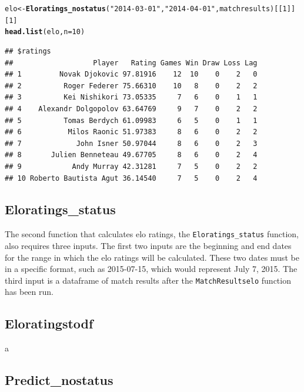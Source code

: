 \documentclass{article}\usepackage[]{graphicx}\usepackage[]{color}
\makeatletter
\newcommand{\hlnum}[1]{\textcolor[rgb]{0.686,0.059,0.569}{#1}}%
\newcommand{\hlstr}[1]{\textcolor[rgb]{0.192,0.494,0.8}{#1}}%
\newcommand{\hlstd}[1]{\textcolor[rgb]{0.345,0.345,0.345}{#1}}%
\newcommand{\hlkwb}[1]{\textcolor[rgb]{0.69,0.353,0.396}{#1}}%
\newcommand{\hlkwc}[1]{\textcolor[rgb]{0.333,0.667,0.333}{#1}}%
\newcommand{\hlkwd}[1]{\textcolor[rgb]{0.737,0.353,0.396}{\textbf{#1}}}%
\newenvironment{kframe}{%
 \def\at@end@of@kframe{}%
 \ifinner\ifhmode%
  \def\at@end@of@kframe{\end{minipage}}%
  \begin{minipage}{\columnwidth}%
 \fi\fi%
 \def\FrameCommand##1{\hskip\@totalleftmargin \hskip-\fboxsep
 \colorbox{shadecolor}{##1}\hskip-\fboxsep
     \hskip-\linewidth \hskip-\@totalleftmargin \hskip\columnwidth}%
 \MakeFramed {\advance\hsize-\width
   \@totalleftmargin\z@ \linewidth\hsize
   \@setminipage}}%
 {\par\unskip\endMakeFramed%
 \at@end@of@kframe}
\newenvironment{knitrout}{}{} %
\numberwithin{equation}{section} %
\makeatother
\begin{document}
\begin{knitrout}
\color{fgcolor}\begin{kframe}
\begin{alltt}
\hlstd{elo} \hlkwb{<-} \hlkwd{Eloratings_nostatus}\hlstd{(}\hlstr{"2014-03-01"}\hlstd{,}\hlstr{"2014-04-01"}\hlstd{,matchresults)[[}\hlnum{1}\hlstd{]][}\hlnum{1}\hlstd{]}
\hlkwd{head.list}\hlstd{(elo ,}\hlkwc{n}\hlstd{=}\hlnum{10}\hlstd{)}
\end{alltt}
\begin{verbatim}
## $ratings
##                   Player   Rating Games Win Draw Loss Lag
## 1         Novak Djokovic 97.81916    12  10    0    2   0
## 2          Roger Federer 75.66310    10   8    0    2   2
## 3          Kei Nishikori 73.05335     7   6    0    1   1
## 4    Alexandr Dolgopolov 63.64769     9   7    0    2   2
## 5          Tomas Berdych 61.09983     6   5    0    1   1
## 6           Milos Raonic 51.97383     8   6    0    2   2
## 7             John Isner 50.97044     8   6    0    2   3
## 8       Julien Benneteau 49.67705     8   6    0    2   4
## 9            Andy Murray 42.31281     7   5    0    2   2
## 10 Roberto Bautista Agut 36.14540     7   5    0    2   4
\end{verbatim}
\end{kframe}
\end{knitrout}

\subsection{Eloratings\_status}

The second function that calculates elo ratings, the \texttt{Eloratings\_status} function, also requires three inputs.  The first two inputs are the beginning and end dates for the range in which the elo ratings will be calculated.  These two dates must be in a specific format, such as 2015-07-15, which would represent July 7, 2015.  The third input is a dataframe of match results after the \texttt{MatchResultselo} function has been run.  

\subsection{Eloratingstodf}

a

\subsection{Predict\_nostatus}
\end{document}

